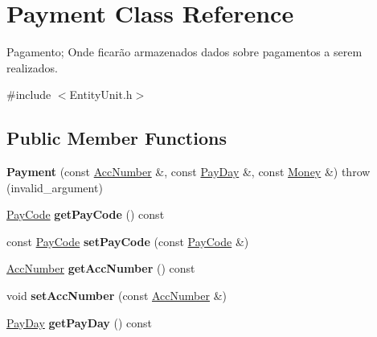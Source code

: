 \hypertarget{classPayment}{\section{Payment Class Reference}
\label{classPayment}
}


Pagamento; Onde ficarão armazenados dados sobre pagamentos a serem realizados.  




{\ttfamily \#include $<$Entity\-Unit.\-h$>$}

\subsection*{Public Member Functions}
\begin{DoxyCompactItemize}
\item 
\hypertarget{classPayment_a91b7742c5f9b4617e4a3bce6507cce49}{{\bfseries Payment} (const \hyperlink{classAccNumber}{Acc\-Number} \&, const \hyperlink{classPayDay}{Pay\-Day} \&, const \hyperlink{classMoney}{Money} \&)  throw (invalid\-\_\-argument)}\label{classPayment_a91b7742c5f9b4617e4a3bce6507cce49}

\item 
\hypertarget{classPayment_a1d71998fa33e757bb350eb40895865ae}{\hyperlink{classPayCode}{Pay\-Code} {\bfseries get\-Pay\-Code} () const }\label{classPayment_a1d71998fa33e757bb350eb40895865ae}

\item 
\hypertarget{classPayment_adf458db6331e53948a473a04a0d622a4}{const \hyperlink{classPayCode}{Pay\-Code} {\bfseries set\-Pay\-Code} (const \hyperlink{classPayCode}{Pay\-Code} \&)}\label{classPayment_adf458db6331e53948a473a04a0d622a4}

\item 
\hypertarget{classPayment_a66c51330aef2e045884e25618a194904}{\hyperlink{classAccNumber}{Acc\-Number} {\bfseries get\-Acc\-Number} () const }\label{classPayment_a66c51330aef2e045884e25618a194904}

\item 
\hypertarget{classPayment_a5d0e83f83f090acf4b33bc81f5391ca0}{void {\bfseries set\-Acc\-Number} (const \hyperlink{classAccNumber}{Acc\-Number} \&)}\label{classPayment_a5d0e83f83f090acf4b33bc81f5391ca0}

\item 
\hypertarget{classPayment_a22ee22d04f3f5757f115386aa3337c51}{\hyperlink{classPayDay}{Pay\-Day} {\bfseries get\-Pay\-Day} () const }\label{classPayment_a22ee22d04f3f5757f115386aa3337c51}


\end{DoxyCompactItemize}
